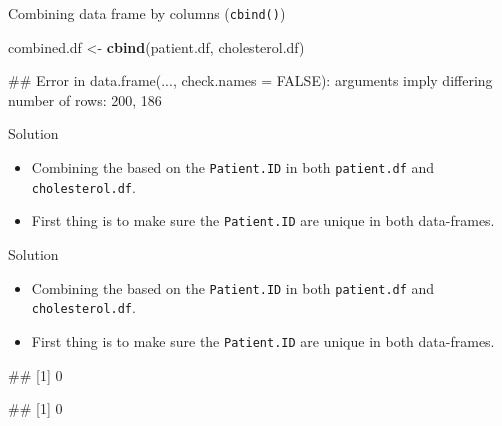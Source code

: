 \documentclass[ignorenonframetext,]{beamer}
\newenvironment{Shaded}{\begin{snugshade}}{\end{snugshade}}
\newcommand{\KeywordTok}[1]{\textcolor[rgb]{0.13,0.29,0.53}{\textbf{#1}}}
\newcommand{\DecValTok}[1]{\textcolor[rgb]{0.00,0.00,0.81}{#1}}
\newcommand{\StringTok}[1]{\textcolor[rgb]{0.31,0.60,0.02}{#1}}
\newcommand{\OperatorTok}[1]{\textcolor[rgb]{0.81,0.36,0.00}{\textbf{#1}}}
\newcommand{\NormalTok}[1]{#1}
\providecommand{\tightlist}{%
  \setlength{\itemsep}{0pt}\setlength{\parskip}{0pt}}
\let\oldShaded\Shaded
\let\endoldShaded\endShaded
\renewenvironment{Shaded}{\footnotesize\oldShaded}{\endoldShaded}
\let\oldverbatim\verbatim
\let\endoldverbatim\endverbatim
\renewenvironment{verbatim}{\footnotesize\oldverbatim}{\endoldverbatim}
\begin{document}
\begin{frame}[fragile]{Combining data frame by columns
(\texttt{cbind()})}

\begin{Shaded}
\begin{Highlighting}[]
\NormalTok{combined.df <-}\StringTok{ }\KeywordTok{cbind}\NormalTok{(patient.df, cholesterol.df)}
\end{Highlighting}
\end{Shaded}

\begin{verbatim}
## Error in data.frame(..., check.names = FALSE): arguments imply differing number of rows: 200, 186
\end{verbatim}

\end{frame}

\begin{frame}[fragile]{Solution}

\begin{itemize}
\tightlist
\item
  Combining the based on the \texttt{Patient.ID} in both
  \texttt{patient.df} and \texttt{cholesterol.df}.
\item
  First thing is to make sure the \texttt{Patient.ID} are unique in both
  data-frames.
\end{itemize}

\end{frame}

\begin{frame}[fragile]{Solution}

\begin{itemize}
\tightlist
\item
  Combining the based on the \texttt{Patient.ID} in both
  \texttt{patient.df} and \texttt{cholesterol.df}.
\item
  First thing is to make sure the \texttt{Patient.ID} are unique in both
  data-frames.
\end{itemize}

\begin{Shaded}
\end{Shaded}

\begin{verbatim}
## [1] 0
\end{verbatim}

\begin{Shaded}
\end{Shaded}

\begin{verbatim}
## [1] 0
\end{verbatim}

\end{frame}
\end{document}

